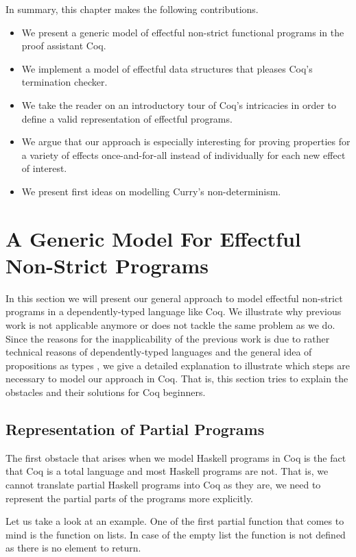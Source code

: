 In summary, this chapter makes the following contributions.

\begin{itemize}
\item We present a generic model of effectful non-strict functional programs in the proof assistant Coq.
\item We implement a model of effectful data structures that pleases Coq's termination checker.
\item We take the reader on an introductory tour of Coq's intricacies in
order to define a valid representation of effectful programs.
\item We argue that our approach is especially interesting for proving properties for a variety of effects once-and-for-all instead of individually for each new effect of interest.
\item We present first ideas on modelling Curry's non-determinism.
\end{itemize}
 
\section{A Generic Model For Effectful Non-Strict Programs}

In this section we will present our general approach to model effectful non-strict programs in a dependently-typed language like Coq.
We illustrate why previous work is not applicable anymore or does not tackle the same problem as we do.
Since the reasons for the inapplicability of the previous work is due to rather technical reasons of dependently-typed languages and the general idea of propositions as types \citep{wadler2015propositions}, we give a detailed explanation to illustrate which steps are necessary to model our approach in Coq.
That is, this section tries to explain the obstacles and their solutions for Coq beginners.

\subsection{Representation of Partial Programs}
\label{subsec:partial}
The first obstacle that arises when we model Haskell programs in Coq is the fact that Coq is a total language and most Haskell programs are not.
That is, we cannot translate partial Haskell programs into Coq as they are, we need to represent the partial parts of the programs more explicitly.

Let us take a look at an example.
One of the first partial function that comes to mind is the  function on lists.
In case of the empty list the function is not defined as there is no element to return.

